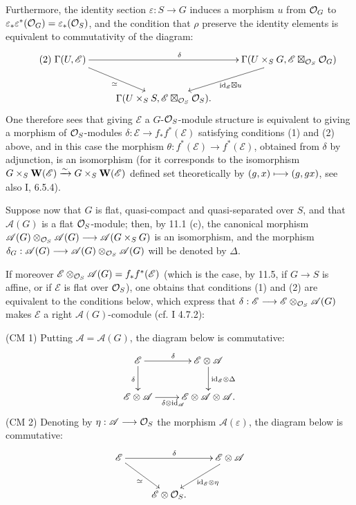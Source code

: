 Furthermore, the identity section $\varepsilon:S\to G$ induces a morphism $u$ from $\mathcal{O}_G$ to $\varepsilon_*\varepsilon^*(\mathcal{O}_G)=\varepsilon_*(\mathcal{O}_S)$, and the condition that $\rho$ preserve the identity elements is equivalent to commutativity of the diagram:
\begin{equation*}\tag{2}
\xymatrix@C=25pt{\Gamma(U,\mathscr E)\ar[rr]^\delta\ar[dr]_\simeq&&\Gamma(U\times_S G,\mathscr E\boxtimes_{\OS}\OO_G)\ar[dl]^{\mathrm{id}_{\mathscr E}\boxtimes u}\\&\Gamma(U\times_S S,\mathscr E\boxtimes_{\OS}\OS).&}
\end{equation*}
One therefore sees that giving $\mathscr E$ a $G$-$\mathcal{O}_S$-module structure is equivalent to giving a morphism of $\mathcal{O}_S$-modules $\delta:\mathscr E\to f_*f^*(\mathscr E)$ satisfying conditions (1) and (2) above, and in this case the morphism $\theta:f^*(\mathscr E)\to f^*(\mathscr E)$, obtained from $\delta$ by adjunction, is an isomorphism (for it corresponds to the isomorphism $G\times_S\mathbf W(\mathscr E)\xrightarrow{\sim} G\times_S\mathbf W(\mathscr E)$ defined set theoretically by $(g,x)\longmapsto(g,gx)$, see also I, 6.5.4).

Suppose now that $G$ is flat, quasi-compact and quasi-separated over $S$, and that $\mathscr A(G)$ is a flat $\mathcal{O}_S$-module; then, by 11.1 (c), the canonical morphism $\mathscr A(G)\otimes_{\mathcal{O}_S}\mathscr A(G)\longrightarrow\mathscr A(G\times_S G)$ is an isomorphism, and the morphism $\delta_G:\mathscr A(G)\longrightarrow\mathscr A(G)\otimes_{\mathcal{O}_S}\mathscr A(G)$ will be denoted by $\Delta$.

If moreover $\mathscr E\otimes_{\mathcal{O}_S}\mathscr A(G)=f_*f^*(\mathscr E)$ (which is the case, by 11.5, if $G\to S$ is affine, or if $\mathscr E$ is flat over $\mathcal{O}_S$), one obtains that conditions (1) and (2) are equivalent to the conditions below, which express that $\delta:\mathscr E\longrightarrow\mathscr E\otimes_{\mathcal{O}_S}\mathscr A(G)$ makes $\mathscr E$ a right $\mathscr A(G)$-comodule (cf. I 4.7.2):

(CM 1) Putting $\mathscr A=\mathscr A(G)$, the diagram below is commutative:
\[
\xymatrix{\mathscr E\ar[r]^\delta\ar[d]_\delta&\mathscr E\otimes\mathscr A\ar[d]^{\mathrm{id}_{\mathscr E}\otimes\Delta}\\\mathscr E\otimes\mathscr A\ar[r]_{\delta\otimes\mathrm{id}_{\mathscr A}}&\mathscr E\otimes\mathscr A\otimes\mathscr A.}
\]
(CM 2) Denoting by $\eta:\mathscr A\longrightarrow\mathcal{O}_S$ the morphism $\mathscr A(\varepsilon)$, the diagram below is commutative:
\[
\xymatrix{\mathscr E\ar[rr]^\delta\ar[dr]_\simeq&&\mathscr E\otimes\mathscr A\ar[dl]^{\mathrm{id}_{\mathscr E}\otimes\eta}\\&\mathscr E\otimes\OS.&}
\]

